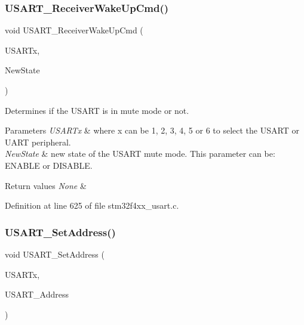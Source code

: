 \subsubsection{\texorpdfstring{U\+S\+A\+R\+T\+\_\+\+Receiver\+Wake\+Up\+Cmd()}{USART\_ReceiverWakeUpCmd()}}
{\footnotesize\ttfamily void U\+S\+A\+R\+T\+\_\+\+Receiver\+Wake\+Up\+Cmd (\begin{DoxyParamCaption}\item[{\hyperlink{struct_u_s_a_r_t___type_def}{U\+S\+A\+R\+T\+\_\+\+Type\+Def} $\ast$}]{U\+S\+A\+R\+Tx,  }\item[{Functional\+State}]{New\+State }\end{DoxyParamCaption})}



Determines if the U\+S\+A\+RT is in mute mode or not. 


\begin{DoxyParams}{Parameters}
{\em U\+S\+A\+R\+Tx} & where x can be 1, 2, 3, 4, 5 or 6 to select the U\+S\+A\+RT or U\+A\+RT peripheral. \\
\hline
{\em New\+State} & new state of the U\+S\+A\+RT mute mode. This parameter can be\+: E\+N\+A\+B\+LE or D\+I\+S\+A\+B\+LE. \\
\hline
\end{DoxyParams}

\begin{DoxyRetVals}{Return values}
{\em None} & \\
\hline
\end{DoxyRetVals}


Definition at line 625 of file stm32f4xx\+\_\+usart.\+c.

\mbox{\label{group___u_s_a_r_t___group3_ga65ec9928817f3f031dd9a4dfc95d6666}} 
\subsubsection{\texorpdfstring{U\+S\+A\+R\+T\+\_\+\+Set\+Address()}{USART\_SetAddress()}}
{\footnotesize\ttfamily void U\+S\+A\+R\+T\+\_\+\+Set\+Address (\begin{DoxyParamCaption}\item[{\hyperlink{struct_u_s_a_r_t___type_def}{U\+S\+A\+R\+T\+\_\+\+Type\+Def} $\ast$}]{U\+S\+A\+R\+Tx,  }\item[{uint8\+\_\+t}]{U\+S\+A\+R\+T\+\_\+\+Address }\end{DoxyParamCaption})}




